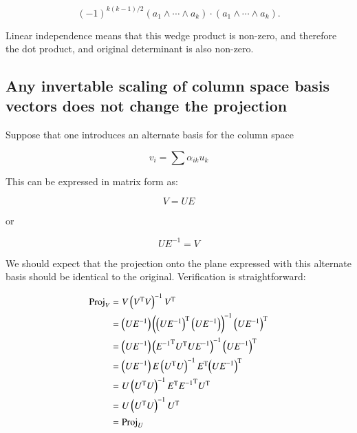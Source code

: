 \documentclass{article}      %
\DeclareMathOperator{\TextTranspose}{T}
\newcommand{\transpose}[1]{{{#1}^{\TextTranspose}}}
\begin{document}
\[
(-1)^{k(k-1)/2} (a_1 \wedge \cdots \wedge a_k) \cdot (a_1 \wedge \cdots \wedge a_k).
\]

Linear independence means that this wedge product is non-zero, and therefore the dot product, and original determinant is also non-zero.

\subsection{ Any invertable scaling of column space basis vectors does not change the projection }

Suppose that one introduces an alternate basis for the column space

\[
v_i = \sum \alpha_{ik} u_k
\]

This can be expressed in matrix form as:

\[
V = U E
\]

or

\[
U E^{-1} = V
\]

We should expect that the projection onto the plane expressed with this alternate basis should be identical to the original.  Verification
is straightforward:

\begin{align*}
\Proj_V 
&= V \left(\transpose{V} V\right)^{-1} \transpose{V} \\
&= \left(U E^{-1}\right) \left(\transpose{\left(U E^{-1}\right)} \left(U E^{-1}\right)\right)^{-1} \transpose{\left(U E^{-1}\right)} \\
&= \left(U E^{-1}\right) \left( \transpose{E^{-1}} \transpose{U} U E^{-1}\right)^{-1} \transpose{\left(U E^{-1}\right)} \\
&= \left(U E^{-1}\right) E \left( \transpose{U}U\right)^{-1} \transpose{E} \transpose{\left(U E^{-1}\right)} \\
&= U \left( \transpose{U}U\right)^{-1} \transpose{E} \transpose{E^{-1}} \transpose{U} \\
&= U \left( \transpose{U}U\right)^{-1} \transpose{U} \\
&= \Proj_U
\end{align*}
\end{document}
